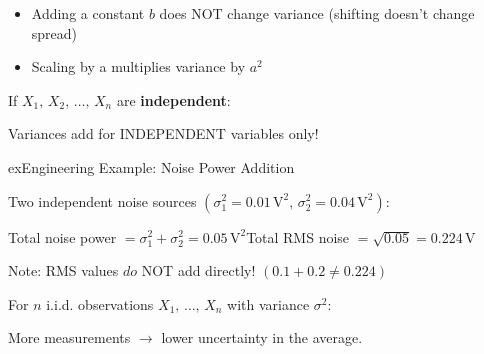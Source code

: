


\begin{itemize}
\tightlist
\item
  Adding a constant $b$ does NOT change variance (shifting doesn’t change spread)
\item
  Scaling by a multiplies variance by $a^{2}$
\end{itemize}


If $X_{1},\, X_{2},\, \ldots,\, X_{n}$ are \textbf{independent}:


\begin{PSquote}

\PSwarn{} Variances add for INDEPENDENT variables only!

\end{PSquote}

\begin{PSbox}[unbreakable]{ex}{Engineering Example: Noise Power Addition}

Two independent noise sources $(\sigma_{1}^{2} = 0.01\,\mathrm{V}^{2},\, \sigma_{2}^{2} = 0.04\,\mathrm{V}^{2})$:

Total noise power $= \sigma_{1}^{2} + \sigma_{2}^{2} = 0.05\,\mathrm{V}^{2}$\PSbr{}Total RMS noise $= \sqrt{0.05} = 0.224\,\mathrm{V}$

Note: RMS values $do$ NOT add directly! $(0.1 + 0.2 \ne 0.224)$

\end{PSbox}


For $n$ i.i.d. observations $X_{1},\, \ldots,\, X_{n}$ with variance $\sigma^{2}$:


More measurements \ensuremath{\to} lower uncertainty in the average.




